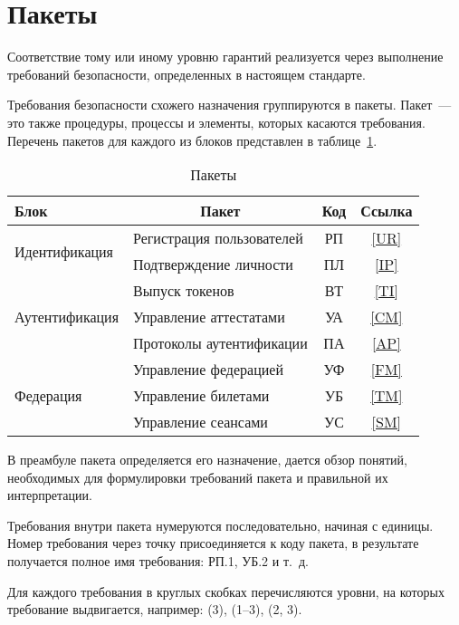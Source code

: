 \section{Пакеты}\label{COMMON.Packets}

Соответствие тому или иному уровню гарантий реализуется через выполнение 
требований безопасности, определенных в настоящем стандарте.

Требования безопасности схожего назначения группируются в пакеты. 
Пакет~--- это также процедуры, процессы и элементы, которых касаются требования.
%
Перечень пакетов для каждого из блоков представлен в таблице~\ref{Table.COMMON.Packages}.

\begin{table}[hbt]
\caption{Пакеты}\label{Table.COMMON.Packages}
\begin{tabular}{|l|l|c|c|}
\hline
Блок & \multicolumn{1}{c|}{Пакет} & Код & Ссылка\\
\hline
\hline
\multirow{2}{*}{Идентификация} 
  & Регистрация пользователей & РП & \ref{UR}\\
  & Подтверждение личности    & ПЛ & \ref{IP}\\
\hline
\hline
\multirow{3}{*}{Аутентификация} 
  & Выпуск токенов            & ВТ & \ref{TI}\\
  & Управление аттестатами    & УА & \ref{CM}\\
  & Протоколы аутентификации  & ПА & \ref{AP}\\
\hline
\hline
\multirow{3}{*}{Федерация} 
  & Управление федерацией     & УФ & \ref{FM}\\
  & Управление билетами       & УБ & \ref{TM}\\
  & Управление сеансами       & УС & \ref{SM}\\
\hline
\end{tabular}
\end{table}

В преамбуле пакета определяется его назначение, дается обзор понятий, 
необходимых для формулировки требований пакета и правильной их интерпретации. 

Требования внутри пакета нумеруются последовательно, начиная с единицы. Номер
требования через точку присоединяется к коду пакета, в результате получается полное
имя требования: РП.1, УБ.2 и т.~д.

Для каждого требования в круглых скобках перечисляются уровни, на которых 
требование выдвигается, например: (3), (1–3), (2, 3). 


